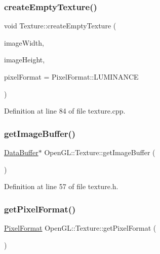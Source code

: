 \subsubsection{\texorpdfstring{createEmptyTexture()}{createEmptyTexture()}}
{\footnotesize\ttfamily void Texture\+::create\+Empty\+Texture (\begin{DoxyParamCaption}\item[{int}]{image\+Width,  }\item[{int}]{image\+Height,  }\item[{\mbox{\hyperlink{namespace_open_g_l_a85472a7a9e32091b8a7ed8dc728d505b}{Pixel\+Format}}}]{pixel\+Format = {\ttfamily PixelFormat\+:\+:LUMINANCE} }\end{DoxyParamCaption})}



Definition at line 84 of file texture.\+cpp.

\mbox{\label{class_open_g_l_1_1_texture_aa47ea4825ad19b5c91b97afad57e1806}} 
\subsubsection{\texorpdfstring{getImageBuffer()}{getImageBuffer()}}
{\footnotesize\ttfamily \mbox{\hyperlink{class_data_buffer}{Data\+Buffer}}$\ast$ Open\+G\+L\+::\+Texture\+::get\+Image\+Buffer (\begin{DoxyParamCaption}{ }\end{DoxyParamCaption})\hspace{0.3cm}{\ttfamily [inline]}}



Definition at line 57 of file texture.\+h.

\mbox{\label{class_open_g_l_1_1_texture_acc763a16c79059cbbb2ae91b8d5f1f13}} 
\subsubsection{\texorpdfstring{getPixelFormat()}{getPixelFormat()}}
{\footnotesize\ttfamily \mbox{\hyperlink{namespace_open_g_l_a85472a7a9e32091b8a7ed8dc728d505b}{Pixel\+Format}} Open\+G\+L\+::\+Texture\+::get\+Pixel\+Format (\begin{DoxyParamCaption}{ }\end{DoxyParamCaption})\hspace{0.3cm}{\ttfamily [inline]}}



